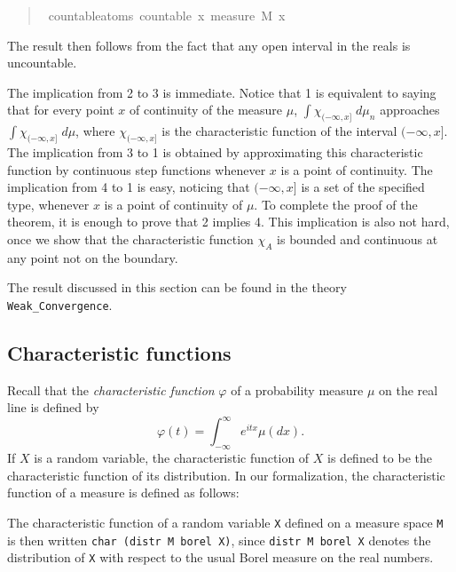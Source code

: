 \documentclass{svjour3}
\newcommand{\ph}{\varphi}
\newcommand{\todo}[1]{\fxnote{#1}}
\begin{document}
\begin{quote}
\begin{isabellebody}
\isamarkupfalse%
\ countable{\isacharunderscore}atoms{\isacharcolon}\ {\isachardoublequoteopen}countable\ {\isacharbraceleft}x{\isachardot}\ measure\ M\ {\isacharbraceleft}x{\isacharbraceright}\ {\isachargreater}\ {}{\isacharbraceright}{\isachardoublequoteclose}
\end{isabellebody}
\end{quote}
The result then follows from the fact that any open interval in the reals is uncountable. 

The implication from 2 to 3 is immediate. Notice that 1 is equivalent to saying that for every point $x$ of continuity of the measure $\mu$, $\int \chi_{(-\infty,x]} \; d\mu_n$ approaches $\int \chi_{(-\infty,x]} \; d\mu$, where $\chi_{(-\infty,x]}$ is the characteristic function of the interval $(-\infty,x]$. The implication from 3 to 1 is obtained by approximating this characteristic function by continuous step functions whenever $x$ is a point of continuity. The implication from 4 to 1 is easy, noticing that $(-\infty,x]$ is a set of the specified type, whenever $x$ is a point of continuity of $\mu$. To complete the proof of the theorem, it is enough to prove that 2 implies 4. This implication is also not hard, once we show that the characteristic function $\chi_A$ is bounded and continuous at any point not on the boundary.

The result discussed in this section can be found in the theory \verb=Weak_Convergence=.

\subsection{Characteristic functions}
\label{subsection:characteristic}

Recall that the \emph{characteristic function} $\ph$ of a probability measure $\mu$ on the real line is defined by
\[
\ph(t) = \int_{-\infty}^{\infty} e^{itx} \mu(dx).
\]
If $X$ is a random variable, the characteristic function of $X$ is defined to be the characteristic function of its distribution.
In our formalization, the characteristic function of a measure is defined as follows:
\begin{quote}
 \todo{Insert.}
\end{quote}
The characteristic function of a random variable \texttt{X} defined on a measure space \texttt{M} is then written \texttt{char (distr M borel X)}, since \texttt{distr M borel X} denotes the distribution of \texttt{X} with respect to the usual Borel measure on the real numbers.
\end{document}
